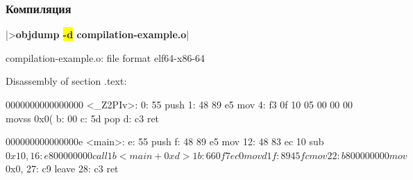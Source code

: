 \documentclass[compress]{beamer}
\newcommand{\shellprompt}{>}
\newcommand{\shellcommand}[1]{\shellprompt \space \textbf{#1}}
\begin{document}
\begin{frame}[fragile]

    \frametitle{Компиляция}

        \begin{ConsoleWindow}
|\shellcommand{objdump \colorbox{yellow}{-d} compilation-example.o}|

compilation-example.o:     file format elf64-x86-64


Disassembly of section .text:

0000000000000000 <_Z2PIv>:
   0:   55                      push   %
   1:   48 89 e5                mov    %
   4:   f3 0f 10 05 00 00 00    movss  0x0(%
   b:   00
   c:   5d                      pop    %
   d:   c3                      ret

000000000000000e <main>:
   e:   55                      push   %
   f:   48 89 e5                mov    %
  12:   48 83 ec 10             sub    $0x10,%
  16:   e8 00 00 00 00          call   1b <main+0xd>
  1b:   66 0f 7e c0             movd   %
  1f:   89 45 fc                mov    %
  22:   b8 00 00 00 00          mov    $0x0,%
  27:   c9                      leave
  28:   c3                      ret
        \end{ConsoleWindow}

    \centering

\end{frame}
\end{document}
